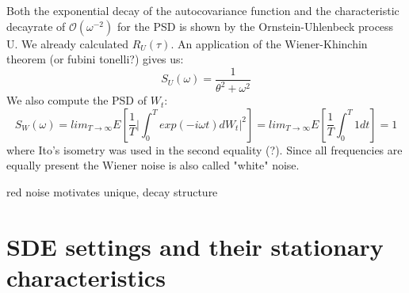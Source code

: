 \documentclass[%
thesis=student,%
coverpage=false,%
titlepage=false,%
headmarks=true, %
german,%
font=libertine, %
math=newpxtx, %
BCOR=5mm,%
coverBCOR=11mm%
]{tumbook}
\begin{document}
Both the exponential decay of the autocovariance function and the characteristic decayrate of $\mathcal{O}(\omega^{-2})$ for the PSD is shown by the Ornstein-Uhlenbeck process U. We already calculated $R_{U}(\tau)$. An application of the Wiener-Khinchin theorem (or fubini tonelli?) gives us: 
\[
    S_{U}(\omega) = \frac{1}{\theta^{2} + \omega^{2}}
\]
We also compute the PSD of $W_{t}$:
\[
S_{W}(\omega) =  lim_{T\rightarrow\infty}E[\frac{1}{T}\lvert\int_{0}^{T}exp(-i\omega t)dW_{t}\rvert^{2}] = lim_{T\rightarrow \infty}E[\frac{1}{T}\int_{0}^{T}1dt] = 1
\]
where Ito's isometry was used in the second equality (?). Since all frequencies are equally present the Wiener noise is also called "white" noise.


red noise motivates unique, decay structure



\chapter{SDE settings and their stationary characteristics}
\end{document}
